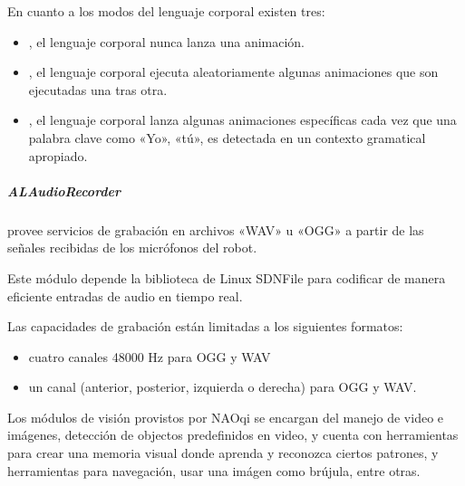 \begin{sphinxVerbatim}[commandchars=\\\{\}]
\end{sphinxVerbatim}


En cuanto a los modos del lenguaje corporal existen tres:
\begin{itemize}
\item {} 
, el lenguaje corporal nunca lanza una animación.

\item {} 
, el lenguaje corporal ejecuta aleatoriamente algunas animaciones que son ejecutadas una tras otra.

\item {} 
, el lenguaje corporal lanza algunas animaciones específicas cada vez que una palabra clave como «Yo», «tú», es detectada en un contexto gramatical apropiado.

\end{itemize}


\subparagraph{ALAudioRecorder}
\label{\detokenize{chapter_one/naoqi:alaudiorecorder}}
 provee servicios de grabación en archivos «WAV»
u «OGG» a partir de las señales recibidas de los micrófonos del robot.

Este módulo depende la biblioteca de Linux SDNFile para
codificar de manera eficiente entradas de audio en tiempo real.

Las capacidades de grabación están limitadas a los siguientes
formatos:
\begin{itemize}
\item {} 
cuatro canales 48000 Hz para OGG y WAV

\item {} 
un canal (anterior, posterior, izquierda o derecha) para OGG y WAV.

\end{itemize}

Los módulos de visión provistos por NAOqi se encargan del manejo de video e
imágenes, detección de objectos predefinidos en video, y cuenta con herramientas
para crear una memoria visual donde aprenda y reconozca ciertos patrones,
y herramientas para navegación, usar una imágen como brújula, entre otras.


